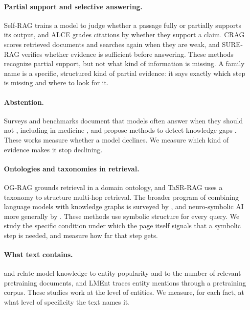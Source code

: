 \documentclass[letterpaper]{article} %
\begin{document}
\paragraph{Partial support and selective answering.}
Self-RAG \citep{asai2024selfrag} trains a model to judge whether a passage
fully or partially supports its output, and ALCE \citep{gao2023alce} grades
citations by whether they support a claim. CRAG \citep{yan2024crag} scores
retrieved documents and searches again when they are weak, and SURE-RAG
\citep{qiu2026sure} verifies whether evidence is sufficient before answering.
These methods recognize partial support, but not what kind of information is
missing. A family name is a specific, structured kind of partial evidence:
it says exactly which step is missing and where to look for it.

\paragraph{Abstention.}
Surveys and benchmarks document that models often answer when they should
not \citep{wen2025abstention,kirichenko2025abstentionbench}, including in
medicine \citep{machcha2026abstain}, and propose methods to detect knowledge
gaps \citep{feng2024abstain,kadavath2022know}. These works measure whether a
model declines. We measure which kind of evidence makes it stop declining.

\paragraph{Ontologies and taxonomies in retrieval.}
OG-RAG \citep{sharma2024ograg} grounds retrieval in a domain ontology, and
TaSR-RAG \citep{sun2026tasr} uses a taxonomy to structure multi-hop retrieval.
The broader program of combining language models with knowledge graphs is
surveyed by \citet{pan2024unifying}, and neuro-symbolic AI more generally by
\citet{garcez2023third}. These methods use symbolic structure for every query.
We study the specific condition under which the page itself signals that a
symbolic step is needed, and measure how far that step gets.

\paragraph{What text contains.}
\citet{mallen2023trust} and \citet{kandpal2023longtail} relate model knowledge
to entity popularity and to the number of relevant pretraining documents, and
LMEnt \citep{gottesman2026lment} traces entity mentions through a pretraining
corpus. These studies work at the level of entities. We measure, for each fact,
at what level of specificity the text names it.
\end{document}
